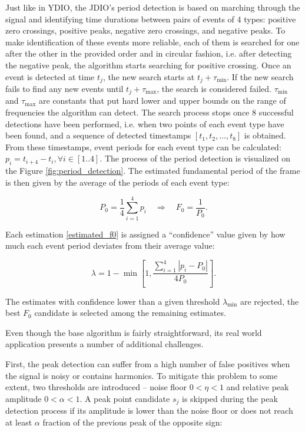 \documentclass[a4paper]{article}
\begin{document}
Just like in YDIO, the JDIO's period detection is based on marching through the signal and identifying time durations between pairs of events of 4 types: positive zero crossings, positive peaks, negative zero crossings, and negative peaks. To make identification of these events more reliable, each of them is searched for one after the other in the provided order and in circular fashion, i.e. after detecting the negative peak, the algorithm starts searching for positive crossing. Once an event is detected at time $t_j$, the new search starts at $t_j + \tau_{\min}$. If the new search fails to find any new events until $t_j + \tau_{\max}$, the search is considered failed. $\tau_{\min}$ and $\tau_{\max}$ are constants that put hard lower and upper bounds on the range of frequencies the algorithm can detect. The search process stops once 8 successful detections have been performed, i.e. when two points of each event type have been found, and a sequence of detected timestamps $ \left[ t_1, t_2, \dots, t_8 \right] $ is obtained. From these timestamps, event periods for each event type can be calculated: $p_i = t_{i+4} - t_i, \forall i \in [1..4]$. The process of the period detection is visualized on the Figure \ref{fig:period_detection}. The estimated fundamental period of the frame is then given by the average of the periods of each event type:

\begin{equation}\label{estimated_f0}
    P_0 = \frac{1}{4} \sum_{i=1}^{4} p_{i} \quad \Rightarrow \quad F_0 = \frac{1}{P_0}.
\end{equation}

Each estimation \eqref{estimated_f0} is assigned a ``confidence'' value given by how much each event period deviates from their average value:

\begin{equation}\label{estimate_confidence}
    \lambda = 1 - \min \left[ 1, \frac{\sum_{i=1}^{4} |p_i - P_0|}{4P_0} \right].
\end{equation}

The estimates with confidence lower than a given threshold $\lambda_{\min}$ are rejected, the best $F_0$ candidate is selected among the remaining estimates.

Even though the base algorithm is fairly straightforward, its real world application presents a number of additional challenges.

First, the peak detection can suffer from a high number of false positives when the signal is noisy or contains harmonics. To mitigate this problem to some extent, two thresholds are introduced -- noise floor $0 < \eta < 1$ and relative peak amplitude $0 < \alpha < 1$. A peak point candidate $s_j$ is skipped during the peak detection process if its amplitude is lower than the noise floor or does not reach at least $\alpha$ fraction of the previous peak of the opposite sign:
\end{document}

